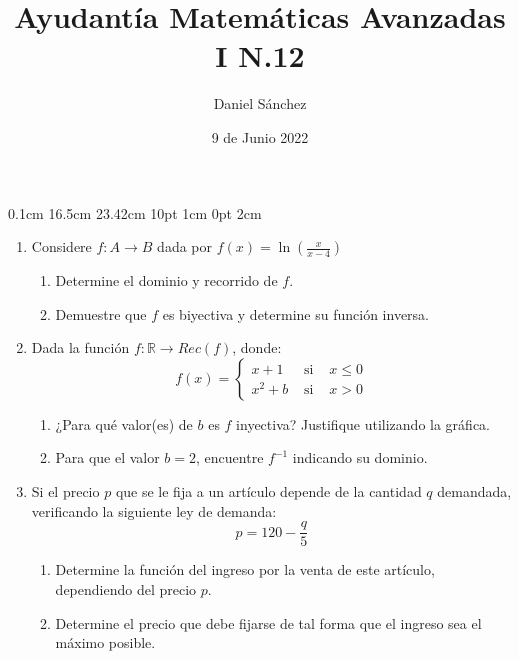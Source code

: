 \documentclass[12pt]{article}
\newcommand{\D}{\displaystyle}
\begin{document}
\setmargins{2.5cm}
{0.1cm}
{16.5cm}
{23.42cm}
{10pt}
{1cm}
{0pt}
{2cm}

\title{Ayudant\'ia Matem\'aticas Avanzadas I N.12}
\date{9 de Junio 2022}
\author{Daniel S\'anchez}
\maketitle

\begin{enumerate}
	\item Considere $\D f: A \rightarrow B$ dada por $\D f(x) = \ln\left(\frac{x}{x-4}\right)$
	      \begin{enumerate}
		      \item Determine el dominio y recorrido de $f$.
		      \item Demuestre que $f$ es biyectiva y determine su funci\'on inversa.
	      \end{enumerate}
	\item Dada la funci\'on $f: \mathbb{R} \rightarrow Rec(f)$, donde:
	      $$f(x) = \left\{\begin{array}{ccc}
			      x+1   & \mbox{ si } & x\leq 0 \\
			      x^2+b & \mbox{ si } & x > 0
		      \end{array}\right.$$
	      \begin{enumerate}
		      \item ¿Para qu\'e valor(es) de $b$ es $f$ inyectiva? Justifique utilizando la gr\'afica.
		      \item Para que el valor $b=2$, encuentre $f^{-1}$ indicando su dominio.
	      \end{enumerate}
	\item Si el precio $p$ que se le fija a un art\'iculo depende de la cantidad $q$ demandada, verificando
	      la siguiente ley de demanda:
	      $$p = 120 - \frac{q}{5}$$
	      \begin{enumerate}
		      \item Determine la funci\'on del ingreso por la venta de este art\'iculo, dependiendo del precio $p$.
		      \item Determine el precio que debe fijarse de tal forma que el ingreso sea el m\'aximo posible.
	      \end{enumerate}
\end{enumerate}
\end{document}

